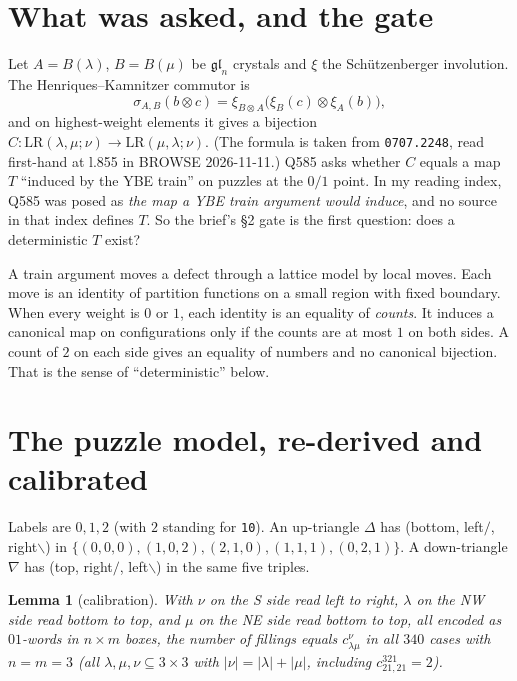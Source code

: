\documentclass[11pt]{article}
\newtheorem{lemma}[theorem]{Lemma}
\theoremstyle{definition}
\theoremstyle{remark}
\newcommand{\LR}{\mathrm{LR}}
\begin{document}
\section{What was asked, and the gate}

Let $A=B(\lambda)$, $B=B(\mu)$ be $\mathfrak{gl}_n$ crystals and $\xi$ the
Sch\"utzenberger involution. The Henriques--Kamnitzer commutor is
\[
  \sigma_{A,B}(b\otimes c)=\xi_{B\otimes A}\bigl(\xi_B(c)\otimes\xi_A(b)\bigr),
\]
and on highest-weight elements it gives a bijection $C:\LR(\lambda,\mu;\nu)\to\LR(\mu,\lambda;\nu)$.
(The formula is taken from \texttt{0707.2248}, read first-hand at l.855 in BROWSE 2026-11-11.)
Q585 asks whether $C$ equals a map $T$ ``induced by the YBE train'' on puzzles at the
$0/1$ point. In my reading index, Q585 was posed as \emph{the map a YBE train argument
would induce}, and no source in that index defines $T$. So the brief's \S2 gate is the
first question: does a deterministic $T$ exist?

A train argument moves a defect through a lattice model by local moves. Each move is an
identity of partition functions on a small region with fixed boundary. When every
weight is $0$ or $1$, each identity is an equality of \emph{counts}. It induces a
canonical map on configurations only if the counts are at most $1$ on both sides. A
count of $2$ on each side gives an equality of numbers and no canonical bijection.
That is the sense of ``deterministic'' below.

\section{The puzzle model, re-derived and calibrated}

Labels are $0,1,2$ (with $2$ standing for \texttt{10}). An up-triangle $\Delta$ has
(bottom, left$/$, right$\backslash$) in
$\{(0,0,0),(1,0,2),(2,1,0),(1,1,1),(0,2,1)\}$. A down-triangle $\nabla$ has
(top, right$/$, left$\backslash$) in the same five triples.

\begin{lemma}[calibration]\label{lem:calib}
With $\nu$ on the S side read left to right, $\lambda$ on the NW side read bottom to
top, and $\mu$ on the NE side read bottom to top, all encoded as $01$-words in
$n\times m$ boxes, the number of fillings equals $c^\nu_{\lambda\mu}$ in all $340$
cases with $n=m=3$ (all $\lambda,\mu,\nu\subseteq 3\times3$ with $|\nu|=|\lambda|+|\mu|$,
including $c^{321}_{21,21}=2$).
\end{lemma}
\end{document}
